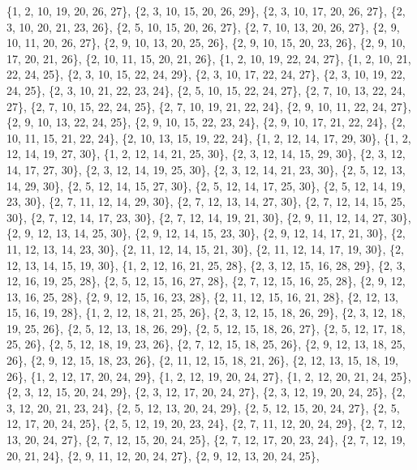 \documentclass[11pt,a4paper]{article}
\begin{document}
{\{1, 2, 10, 19, 20, 26, 27\}, \{2, 3, 10, 15, 20, 26, 29\}, \{2, 3, 10, 17, 20, 26, 27\}, \{2, 3, 10, 20, 21, 23, 26\}, \{2, 5, 10, 15, 20, 26, 27\},
\{2, 7, 10, 13, 20, 26, 27\}, \{2, 9, 10, 11, 20, 26, 27\}, \{2, 9, 10, 13, 20, 25, 26\}, \{2, 9, 10, 15, 20, 23, 26\}, \{2, 9, 10, 17, 20, 21, 26\},
\{2, 10, 11, 15, 20, 21, 26\}, \{1, 2, 10, 19, 22, 24, 27\}, \{1, 2, 10, 21, 22, 24, 25\}, \{2, 3, 10, 15, 22, 24, 29\}, \{2, 3, 10, 17, 22, 24, 27\},
\{2, 3, 10, 19, 22, 24, 25\}, \{2, 3, 10, 21, 22, 23, 24\}, \{2, 5, 10, 15, 22, 24, 27\}, \{2, 7, 10, 13, 22, 24, 27\}, \{2, 7, 10, 15, 22, 24, 25\},
\{2, 7, 10, 19, 21, 22, 24\}, \{2, 9, 10, 11, 22, 24, 27\}, \{2, 9, 10, 13, 22, 24, 25\}, \{2, 9, 10, 15, 22, 23, 24\}, \{2, 9, 10, 17, 21, 22, 24\},
\{2, 10, 11, 15, 21, 22, 24\}, \{2, 10, 13, 15, 19, 22, 24\}, \{1, 2, 12, 14, 17, 29, 30\}, \{1, 2, 12, 14, 19, 27, 30\}, \{1, 2, 12, 14, 21, 25, 30\},
\{2, 3, 12, 14, 15, 29, 30\}, \{2, 3, 12, 14, 17, 27, 30\}, \{2, 3, 12, 14, 19, 25, 30\}, \{2, 3, 12, 14, 21, 23, 30\}, \{2, 5, 12, 13, 14, 29, 30\},
\{2, 5, 12, 14, 15, 27, 30\}, \{2, 5, 12, 14, 17, 25, 30\}, \{2, 5, 12, 14, 19, 23, 30\}, \{2, 7, 11, 12, 14, 29, 30\}, \{2, 7, 12, 13, 14, 27, 30\},
\{2, 7, 12, 14, 15, 25, 30\}, \{2, 7, 12, 14, 17, 23, 30\}, \{2, 7, 12, 14, 19, 21, 30\}, \{2, 9, 11, 12, 14, 27, 30\}, \{2, 9, 12, 13, 14, 25, 30\},
\{2, 9, 12, 14, 15, 23, 30\}, \{2, 9, 12, 14, 17, 21, 30\}, \{2, 11, 12, 13, 14, 23, 30\}, \{2, 11, 12, 14, 15, 21, 30\}, \{2, 11, 12, 14, 17, 19, 30\},
\{2, 12, 13, 14, 15, 19, 30\}, \{1, 2, 12, 16, 21, 25, 28\}, \{2, 3, 12, 15, 16, 28, 29\}, \{2, 3, 12, 16, 19, 25, 28\}, \{2, 5, 12, 15, 16, 27, 28\},
\{2, 7, 12, 15, 16, 25, 28\}, \{2, 9, 12, 13, 16, 25, 28\}, \{2, 9, 12, 15, 16, 23, 28\}, \{2, 11, 12, 15, 16, 21, 28\}, \{2, 12, 13, 15, 16, 19, 28\},
\{1, 2, 12, 18, 21, 25, 26\}, \{2, 3, 12, 15, 18, 26, 29\}, \{2, 3, 12, 18, 19, 25, 26\}, \{2, 5, 12, 13, 18, 26, 29\}, \{2, 5, 12, 15, 18, 26, 27\},
\{2, 5, 12, 17, 18, 25, 26\}, \{2, 5, 12, 18, 19, 23, 26\}, \{2, 7, 12, 15, 18, 25, 26\}, \{2, 9, 12, 13, 18, 25, 26\}, \{2, 9, 12, 15, 18, 23, 26\},
\{2, 11, 12, 15, 18, 21, 26\}, \{2, 12, 13, 15, 18, 19, 26\}, \{1, 2, 12, 17, 20, 24, 29\}, \{1, 2, 12, 19, 20, 24, 27\}, \{1, 2, 12, 20, 21, 24, 25\},
\{2, 3, 12, 15, 20, 24, 29\}, \{2, 3, 12, 17, 20, 24, 27\}, \{2, 3, 12, 19, 20, 24, 25\}, \{2, 3, 12, 20, 21, 23, 24\}, \{2, 5, 12, 13, 20, 24, 29\},
\{2, 5, 12, 15, 20, 24, 27\}, \{2, 5, 12, 17, 20, 24, 25\}, \{2, 5, 12, 19, 20, 23, 24\}, \{2, 7, 11, 12, 20, 24, 29\}, \{2, 7, 12, 13, 20, 24, 27\},
\{2, 7, 12, 15, 20, 24, 25\}, \{2, 7, 12, 17, 20, 23, 24\}, \{2, 7, 12, 19, 20, 21, 24\}, \{2, 9, 11, 12, 20, 24, 27\}, \{2, 9, 12, 13, 20, 24, 25\},
}
\end{document}
